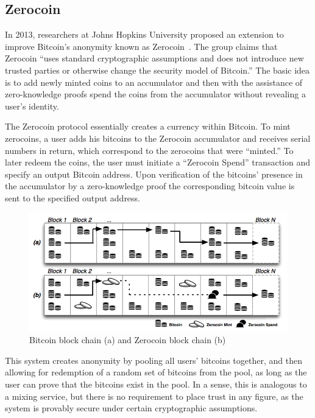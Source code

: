 \documentclass[11pt]{article}
\begin{document}
\subsection{Zerocoin}
In 2013, researchers at Johns Hopkins University proposed an extension to improve Bitcoin's anonymity known as
Zerocoin~\cite{miers13}. The group claims that Zerocoin ``uses standard cryptographic assumptions and does not introduce
new trusted parties or otherwise change the security model of Bitcoin.'' The basic idea is to add newly minted coins to
an accumulator and then with the assistance of zero-knowledge proofs spend the coins from the accumulator without
revealing a user's identity.

The Zerocoin protocol essentially creates a currency within Bitcoin. To mint zerocoins, a user adds his bitcoins to the
Zerocoin accumulator and receives serial numbers in return, which correspond to the zerocoins that were ``minted.'' To
later redeem the coins, the user must initiate a ``Zerocoin Spend'' transaction and specify an output Bitcoin address.
Upon verification of the bitcoins' presence in the accumulator by a zero-knowledge proof the corresponding bitcoin value
is sent to the specified output address.

\begin{figure}[H]
    \centering
    \caption[Bitcoin block chain (a) and Zerocoin block chain (b)]{Bitcoin block chain (a) and Zerocoin block chain (b)~\cite{miers13}}
    \includegraphics[width=\linewidth]{figures/zerocoin.png}
\end{figure}

This system creates anonymity by pooling all users' bitcoins together, and then allowing for redemption of a random set
of bitcoins from the pool, as long as the user can prove that the bitcoins exist in the pool. In a sense, this is
analogous to a mixing service, but there is no requirement to place trust in any figure, as the system is provably
secure under certain cryptographic assumptions.
\end{document}
